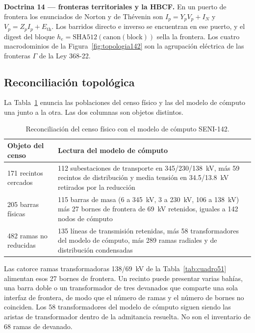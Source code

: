 \textbf{Doctrina 14 --- fronteras territoriales y la HBCF.} En un puerto de frontera los enunciados de Norton y de Th\'evenin son $I_p=Y_p V_p+I_N$ y $V_p=Z_p I_p+E_{\mathrm{th}}$. Los barridos directo e inverso se encuentran en ese puerto, y el digest del bloque $h_e=\mathrm{SHA512}(\mathrm{canon}(\mathrm{block}))$ sella la frontera. Los cuatro macrodominios de la Figura~\ref{fig:topologia142} son la agrupación eléctrica de las fronteras $\Gamma$ de la Ley 368-22.

\subsection{Reconciliación topológica}
\label{sub:crosswalk}

La Tabla~\ref{tab:crosswalk} enuncia las poblaciones del censo físico y las del modelo de cómputo una junto a la otra. Las dos columnas son objetos distintos.

\begin{table}[!t]
\centering
\caption{Reconciliación del censo físico con el modelo de cómputo SENI-142.}
\label{tab:crosswalk}
\begin{tabular}{p{}p{}}
\toprule
Objeto del censo & Lectura del modelo de cómputo \\
\midrule
171 recintos cercados & 112 subestaciones de transporte en 345/230/138~kV, más 59 recintos de distribución y media tensión en 34.5/13.8~kV retirados por la reducción \\
205 barras físicas & 115 barras de masa (6 a 345~kV, 3 a 230~kV, 106 a 138~kV) más 27 bornes de frontera de 69~kV retenidos, iguales a 142 nodos de cómputo \\
482 ramas no reducidas & 135 líneas de transmisión retenidas, más 58 transformadores del modelo de cómputo, más 289 ramas radiales y de distribución condensadas \\
\bottomrule
\end{tabular}
\end{table}

Las catorce ramas transformadoras 138/69~kV de la Tabla~\ref{tab:cuadro51} alimentan esos 27 bornes de frontera. Un recinto puede presentar varias bahías, una barra doble o un transformador de tres devanados que comparte una sola interfaz de frontera, de modo que el número de ramas y el número de bornes no coinciden. Los 58 transformadores del modelo de cómputo siguen siendo las aristas de transformador dentro de la admitancia resuelta. No son el inventario de 68 ramas de devanado.

